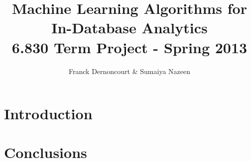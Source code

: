 \documentclass[10pt]{article}
\begin{document}
\title{Machine Learning Algorithms for In-Database Analytics \\ \small{6.830 Term Project - Spring 2013}}
\author{Franck Dernoncourt \& Sumaiya Nazeen}

\maketitle

\section{Introduction}

\section{Conclusions}



\end{document}
